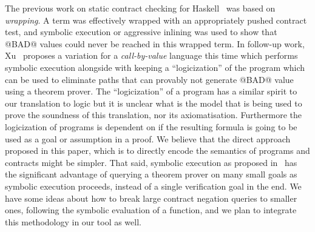 The previous work on static contract checking for Haskell~\cite{xu+:contracts}
was based on {\em wrapping}. A term was effectively wrapped
with an appropriately pushed contract test, and symbolic execution or aggressive inlining was used to show that @BAD@ values could
never be reached in this wrapped term.
In follow-up work, Xu~\cite{Xu:2012:HCC:2103746.2103767} proposes a variation for a
{\em call-by-value} language this time which performs symbolic execution alongside with
keeping a ``logicization'' of the program which can be used to eliminate paths that can
provably not generate @BAD@ value using a theorem prover. The ``logicization'' of a
program has a similar spirit to our translation to logic but it is unclear what is the
model that is being used to prove the soundness of this translation, nor its
axiomatisation. Furthermore the logicization of programs is dependent on if
the resulting formula is going to be used as a goal or assumption in a proof. We believe
that the direct approach proposed in this paper, which is to directly encode the semantics
of programs and contracts might be simpler. That said, symbolic execution as proposed
in~\cite{Xu:2012:HCC:2103746.2103767} has the significant advantage of querying a
theorem prover on many small goals as symbolic execution proceeds, instead of a
single verification goal in the end. We have some ideas about how to break large
contract negation queries to smaller ones, following the symbolic evaluation of
a function, and we plan to integrate this methodology in our tool as well.


